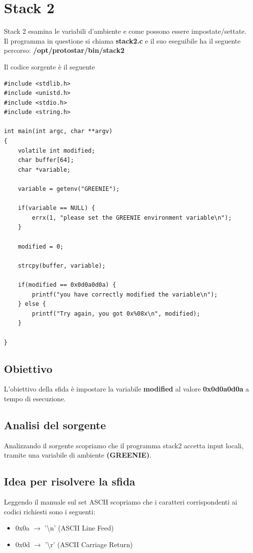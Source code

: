 \section{Stack 2}
Stack 2 esamina le variabili d'ambiente e come possono essere impostate/settate.
Il programma in questione si chiama \textbf{stack2.c} e il suo eseguibile ha il seguente percorso: \textbf{/opt/protostar/bin/stack2}

Il codice sorgente è il seguente
\begin{lstlisting}[style=cstyle]
#include <stdlib.h>
#include <unistd.h>
#include <stdio.h>
#include <string.h>

int main(int argc, char **argv)
{
    volatile int modified;
    char buffer[64];
    char *variable;

    variable = getenv("GREENIE");

    if(variable == NULL) {
        errx(1, "please set the GREENIE environment variable\n");
    }

    modified = 0;

    strcpy(buffer, variable);

    if(modified == 0x0d0a0d0a) {
        printf("you have correctly modified the variable\n");
    } else {
        printf("Try again, you got 0x%08x\n", modified);
    }

}
\end{lstlisting}

\subsection{Obiettivo}
L'obiettivo della sfida è impostare la variabile \textbf{modified} al valore \textbf{0x0d0a0d0a} a tempo di esecuzione.

\subsection{Analisi del sorgente}
Analizzando il sorgente scopriamo che il programma stack2 accetta input locali, tramite una variabile di ambiente \textbf{(GREENIE)}.

\subsection{Idea per risolvere la sfida}
Leggendo il manuale sul set ASCII scopriamo che i caratteri corrispondenti ai codici richiesti sono i seguenti:
\begin{itemize}
    \item 0x0a $\rightarrow$ '\textbackslash n' (ASCII Line Feed)
    \item 0x0d $\rightarrow$ '\textbackslash r' (ASCII Carriage Return)
\end{itemize}

